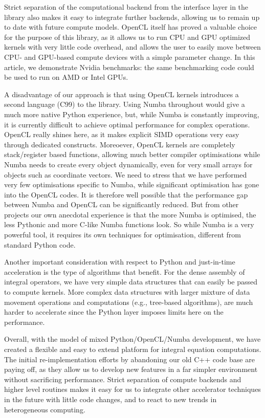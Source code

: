 Strict separation of the computational backend from the interface layer in the library also makes it easy to integrate further backends, allowing us to remain up to date with future compute models. OpenCL itself has proved a valuable choice for the purpose of this library, as it allows us to run CPU and GPU optimized kernels with very little code overhead, and allows the user to easily move between CPU- and GPU-based compute devices with a simple parameter change. In this article, we demonstrate Nvidia benchmarks: the same benchmarking code could be used to run on AMD or Intel GPUs.

A disadvantage of our approach is that using OpenCL kernels introduces a second language (C99) to the library. Using Numba throughout would give a much more native Python experience, but, while Numba is constantly improving, it is currently difficult to achieve optimal performance for complex operations. OpenCL really shines here, as it makes explicit SIMD operations very easy through dedicated constructs. Moreoever, OpenCL kernels are completely stack/register based functions, allowing much better compiler optimisations while Numba needs to create every object dynamically, even for very small arrays for objects such as coordinate vectors. We need to stress that we have performed very few optimisations specific to Numba, while significant optimisation has gone into the OpenCL codes. It is therefore well possible that the performance gap between Numba and OpenCL can be significantly reduced. But from other projects our own anecdotal experience is that the more Numba is optimised, the less Pythonic and more C-like Numba functions look. So while Numba is a very powerful tool, it requires its own techniques for optimisation, different from standard Python code.

Another important consideration with respect to Python and just-in-time acceleration is the type of algorithms that benefit. For the dense assembly of integral operators, we have very simple data structures that can easily be passed to compute kernels. More complex data structures with larger mixture of data movement operations and computations (e.g., tree-based algorithms), are much harder to accelerate since the Python layer imposes limits here on the performance.

Overall, with the model of mixed Python/OpenCL/Numba development, we have created a flexible and easy to extend platform for integral equation computations. The initial re-implementation efforts by abandoning our old C++ code base are paying off, as they allow us to develop new features in a far simpler environment without sacrificing performance. Strict separation of compute backends and higher level routines makes it easy for us to integrate other accelerator techniques in the future with little code changes, and to react to new trends in heterogeneous computing.

